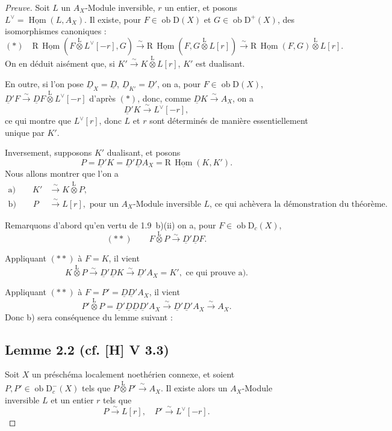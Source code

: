 \documentclass[11pt]{article}
\DeclareMathOperator{\Hom}{Hom}
\newcommand{\R}{\mathrm{R}}
\newcommand{\D}{\mathrm{D}}
\newcommand{\ob}{\operatorname{ob}}
\providecommand{\Hom}{\operatorname{Hom}}
\providecommand{\ob}{\operatorname{ob}}
\begin{document}
\begin{proof}[Preuve]
Soit $L$ un $A_X$-Module inversible, $r$ un entier, et posons $L^{\vee} = \underline{\Hom}(L, A_X)$. Il existe, pour $F \in \ob \D(X)$ et $G \in \ob \D^{+}(X)$, des isomorphismes canoniques :
\[
(*) \quad \R\,\underline{\Hom}(F \mathop{\otimes}\limits^{\mathrm{L}} L^{\vee}[-r], G) \xrightarrow{\sim} \R\,\underline{\Hom}(F, G \mathop{\otimes}\limits^{\mathrm{L}} L[r]) \xrightarrow{\sim} \R\,\underline{\Hom}(F,G) \mathop{\otimes}\limits^{\mathrm{L}} L[r].
\]
On en déduit aisément que, si $K' \xrightarrow{\sim} K \mathop{\otimes}\limits^{\mathrm{L}} L[r]$, $K'$ est dualisant.

En outre, si l'on pose $\underline{D}_X = \underline{D}$, $\underline{D}_{K'} = \underline{D}'$, on a, pour $F \in \ob \D(X)$, $\underline{D}'F \xrightarrow{\sim} \underline{D} F \mathop{\otimes}\limits^{\mathrm{L}} L^{\vee}[-r]$ d'après $(*)$, donc, comme $\underline{D} K \xrightarrow{\sim} A_X$, on a
\[
\underline{D}' K \xrightarrow{\sim} L^{\vee}[-r],
\]
ce qui montre que $L^{\vee}[r]$, donc $L$ et $r$ sont déterminés de manière essentiellement unique par $K'$.

Inversement, supposons $K'$ dualisant, et posons
\[
P = \underline{D}'K = \underline{D}'\underline{D} A_X = \R\,\underline{\Hom}(K,K').
\]
Nous allons montrer que l'on a
\begin{align*}
\text{a)} \qquad K' &\xrightarrow{\sim} K \mathop{\otimes}\limits^{\mathrm{L}} P, \\
\text{b)} \qquad P &\xrightarrow{\sim} L[r], \text{ pour un $A_X$-Module inversible $L$, ce qui achèvera la démonstration du théorème.}
\end{align*}

Remarquons d'abord qu'en vertu de 1.9~b)(ii) on a, pour $F \in \ob \D_c(X)$,
\[
(**) \qquad F \mathop{\otimes}\limits^{\mathrm{L}} P \xrightarrow{\sim} \underline{D}'\underline{D} F.
\]

Appliquant $(**)$ à $F = K$, il vient
\[
K \mathop{\otimes}\limits^{\mathrm{L}} P \xrightarrow{\sim} \underline{D}'\underline{D} K \xrightarrow{\sim} \underline{D}' A_X = K', \text{ ce qui prouve a).}
\]

Appliquant $(**)$ à $F = P' = \underline{D}\underline{D}'A_X$, il vient
\[
P' \mathop{\otimes}\limits^{\mathrm{L}} P = \underline{D}'\underline{D}\underline{D}\underline{D}'A_X \xrightarrow{\sim} \underline{D}'\underline{D}'A_X \xrightarrow{\sim} A_X.
\]
Donc b) sera conséquence du lemme suivant :

\subsection*{Lemme 2.2 (cf. [H] V 3.3)}
Soit $X$ un préschéma localement noethérien connexe, et soient $P, P' \in \ob \D_c^{-}(X)$ tels que $P \mathop{\otimes}\limits^{\mathrm{L}} P' \xrightarrow{\sim} A_X$. Il existe alors un $A_X$-Module inversible $L$ et un entier $r$ tels que
\[
P \xrightarrow{\sim} L[r], \quad P' \xrightarrow{\sim} L^{\vee}[-r].
\]


\end{proof}
\end{document}
